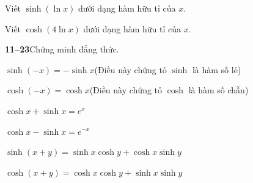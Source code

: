 \begin{minipage}[t]{0.48\linewidth}
    \fontsize{9}{12.5}\selectfont
    \noindent{}Viết $\sinh(\ln x)$ dưới dạng hàm hữu tỉ của $x$.\par\vspace{0.65em}
    \noindent{}Viết $\cosh(4\ln x)$ dưới dạng hàm hữu tỉ của $x$.\par\vspace{0.75em}

    \noindent\textbf{\textsf{\color{stewartcyan}11--23}}\quad Chứng minh đẳng thức.\par\vspace{0.65em}

    \noindent{}$\sinh(-x) = -\sinh x$\hfill{\footnotesize(Điều này chứng tỏ $\sinh$ là hàm số lẻ)}\par\vspace{0.55em}
    \noindent{}$\cosh(-x) = \cosh x$\hfill{\footnotesize(Điều này chứng tỏ $\cosh$ là hàm số chẵn)}\par\vspace{0.55em}
    \noindent{}$\cosh x + \sinh x = e^x$\par\vspace{0.55em}
    \noindent{}$\cosh x - \sinh x = e^{-x}$\par\vspace{0.55em}
    \noindent{}$\sinh(x + y) = \sinh x\cosh y + \cosh x\sinh y$\par\vspace{0.55em}
    \noindent{}$\cosh(x + y) = \cosh x\cosh y + \sinh x\sinh y$\par
\end{minipage}

